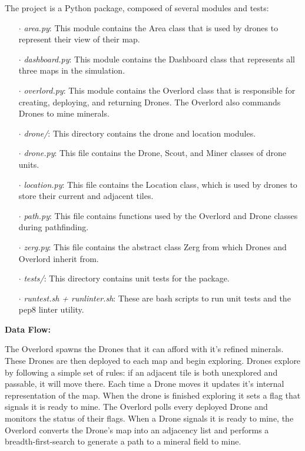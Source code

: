 \documentclass{article}
\begin{document}
The project is a Python package, composed of several modules and tests:
\begin{itemize}
	\item [$\cdot$] \textit{area.py}: This module contains the Area class
	that is used by drones to represent their view of their map.
	\item [$\cdot$] \textit{dashboard.py}: This module contains the
	Dashboard class that represents all three maps in the simulation.
	\item [$\cdot$] \textit{overlord.py}: This module contains the
	Overlord class that is responsible for creating, deploying, and 
	returning Drones. The Overlord also commands Drones to mine minerals.
	\item [$\cdot$] \textit{drone/}: This directory contains the drone and 
	location modules.
	\item [$\cdot$] \textit{drone.py}: This file contains the Drone, Scout,
	and Miner classes of drone units. 
	\item [$\cdot$] \textit{location.py}: This file contains the Location
	class, which is used by drones to store their current and adjacent 
	tiles.
	\item [$\cdot$] \textit{path.py}: This file contains functions used by
	the Overlord and Drone classes during pathfinding.
	\item [$\cdot$] \textit{zerg.py}: This file contains the abstract class
	Zerg from which Drones and Overlord inherit from.
	\item [$\cdot$] \textit{tests/}: This directory contains unit tests for
	the package.
	\item [$\cdot$] \textit{runtest.sh + runlinter.sh}: These are bash
	scripts to run unit tests and the pep8 linter utility.
\end{itemize}

\begin{flushleft}
\textbf{Data Flow:}
\vspace{.5pc}
\end{flushleft}


The Overlord spawns the Drones that it can afford with it's refined 
minerals.  These Drones are then deployed to each map and begin exploring.
Drones explore by following a simple set of rules: if an adjacent tile is
both unexplored and passable, it will move there. Each time a Drone moves
it updates it's internal representation of the map. When the drone is
finished exploring it sets a flag that signals it is ready to mine.  The 
Overlord polls every deployed Drone and monitors the status of their flags.
When a Drone signals it is ready to mine, the Overlord converts the Drone's
map into an adjacency list and performs a breadth-first-search to generate 
a path to a mineral field to mine.
\end{document}
